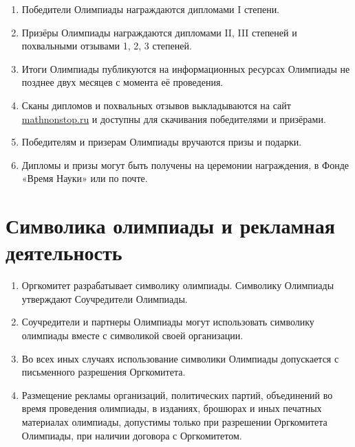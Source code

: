 \documentclass[a4paper,12pt]{article}
\newcommand{\surl}[1]{{\small\url{#1}}}
\begin{document}
\begin{enumerate}
	\item Победители Олимпиады награждаются дипломами I степени.
	\item Призёры Олимпиады награждаются дипломами II, III степеней и похвальными отзывами 1, 2, 3 степеней.
	\item Итоги Олимпиады публикуются на информационных ресурсах Олимпиады не позднее двух месяцев с момента её проведения.
	\item Сканы дипломов и похвальных отзывов выкладываются на сайт \surl{mathnonstop.ru} и доступны для скачивания победителями и призёрами.
	\item Победителям и призерам Олимпиады вручаются призы и подарки.
	\item Дипломы и призы могут быть получены на церемонии награждения, в Фонде «Время Науки» или по почте.
\end{enumerate}

\section{Символика олимпиады и рекламная деятельность}

\begin{enumerate}
	\item Оргкомитет разрабатывает символику олимпиады. Символику
	   Олимпиады утверждают Соучредители Олимпиады.
	\item Соучредители и партнеры Олимпиады могут использовать
	   символику олимпиады вместе с символикой своей организации.
	\item Во всех иных случаях использование символики Олимпиады
	   допускается с письменного разрешения Оргкомитета.
	\item Размещение рекламы организаций, политических партий,
	   объединений во время проведения олимпиады, в изданиях,
	   брошюрах и иных печатных материалах олимпиады, допустимы
	   только при разрешении Оргкомитета Олимпиады, при наличии
	   договора с Оргкомитетом.
\end{enumerate}
\end{document}
